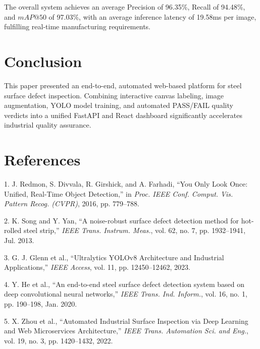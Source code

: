 \documentclass[conference]{IEEEtran}
\begin{document}
The overall system achieves an average Precision of 96.35\%, Recall of 94.48\%, and $mAP@50$ of 97.03\%, with an average inference latency of 19.58ms per image, fulfilling real-time manufacturing requirements.

\section{Conclusion}
This paper presented an end-to-end, automated web-based platform for steel surface defect inspection. Combining interactive canvas labeling, image augmentation, YOLO model training, and automated PASS/FAIL quality verdicts into a unified FastAPI and React dashboard significantly accelerates industrial quality assurance.

\section*{References}

1. J. Redmon, S. Divvala, R. Girshick, and A. Farhadi, ``You Only Look Once: Unified, Real-Time Object Detection,'' in \textit{Proc. IEEE Conf. Comput. Vis. Pattern Recog. (CVPR)}, 2016, pp. 779--788.

2. K. Song and Y. Yan, ``A noise-robust surface defect detection method for hot-rolled steel strip,'' \textit{IEEE Trans. Instrum. Meas.}, vol. 62, no. 7, pp. 1932--1941, Jul. 2013.

3. G. J. Glenn et al., ``Ultralytics YOLOv8 Architecture and Industrial Applications,'' \textit{IEEE Access}, vol. 11, pp. 12450--12462, 2023.

4. Y. He et al., ``An end-to-end steel surface defect detection system based on deep convolutional neural networks,'' \textit{IEEE Trans. Ind. Inform.}, vol. 16, no. 1, pp. 190--198, Jan. 2020.

5. X. Zhou et al., ``Automated Industrial Surface Inspection via Deep Learning and Web Microservices Architecture,'' \textit{IEEE Trans. Automation Sci. and Eng.}, vol. 19, no. 3, pp. 1420--1432, 2022.
\end{document}
